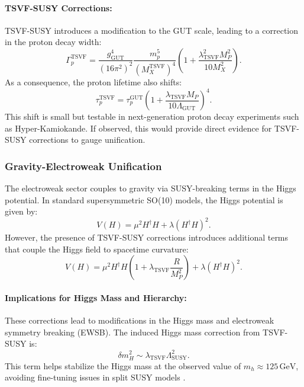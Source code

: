 \documentclass[twocolumn,superscriptaddress,floatfix]{revtex4-2}
\begin{document}
\paragraph{TSVF-SUSY Corrections:} 
TSVF-SUSY introduces a modification to the GUT scale, leading to a correction in the proton decay width:
\begin{equation}
\Gamma_p^{\text{TSVF}} = \frac{g_{\text{GUT}}^4}{(16\pi^2)^2}\frac{m_p^5}{(M_X^{\text{TSVF}})^4}\left(1 + \frac{\lambda_{\text{TSVF}}^2 M_P^2}{10M_X^2}\right). \label{eq:Gamma_p}
\end{equation}
As a consequence, the proton lifetime also shifts:
\begin{equation}
\tau_p^{\text{TSVF}} = \tau_p^{\text{GUT}}\left(1 + \frac{\lambda_{\text{TSVF}} M_P}{10\Lambda_{\text{GUT}}}\right)^4. \label{eq:tau_TSVF}
\end{equation}
This shift is small but testable in next-generation proton decay experiments such as Hyper-Kamiokande. If observed, this would provide direct evidence for TSVF-SUSY corrections to gauge unification.

\subsubsection{Gravity-Electroweak Unification}
\label{subsec:ew_unification}

The electroweak sector couples to gravity via SUSY-breaking terms in the Higgs potential. In standard supersymmetric SO(10) models, the Higgs potential is given by:
\begin{equation}  
V(H) = \mu^2 H^\dagger H + \lambda (H^\dagger H)^2.  
\label{eq:higgs_potential_standard}
\end{equation}
However, the presence of TSVF-SUSY corrections introduces additional terms that couple the Higgs field to spacetime curvature:
\begin{equation}  
V(H) = \mu^2 H^\dagger H \left(1 + \lambda_{\text{TSVF}} \frac{R}{M_P^2}\right) + \lambda (H^\dagger H)^2.  
\label{eq:higgs_potential_tsvf}
\end{equation}

\paragraph{Implications for Higgs Mass and Hierarchy:} 
These corrections lead to modifications in the Higgs mass and electroweak symmetry breaking (EWSB). The induced Higgs mass correction from TSVF-SUSY is:
\begin{equation}
\delta m_H^2 \sim \lambda_{\text{TSVF}} \Lambda_{\text{SUSY}}^2.
\label{eq:higgs_mass_correction}
\end{equation}
This term helps stabilize the Higgs mass at the observed value of \( m_h \approx 125 \, \text{GeV} \), avoiding fine-tuning issues in split SUSY models \cite{ArkaniHamed2005}. 
\end{document}

